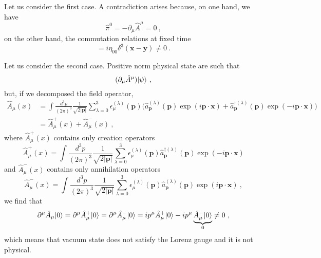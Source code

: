     Let us consider the first case. A contradiction arises because, on one hand, we have 
    \begin{equation*}
        \hat \pi^0 = - \partial_\mu \hat A^\mu = 0 ~,
    \end{equation*}
    on the other hand, the commutation relations at fixed time
    \begin{equation*}
        [\hat A_0 (\mathbf x), \hat \pi_0 (\mathbf y)] = i \eta_{00} \delta^3 (\mathbf x - \mathbf y) \neq 0 ~.
    \end{equation*}

    Let us consider the second case. Positive norm physical state are such that
    \begin{equation*}
        (\partial_\mu \hat A^\mu) \vert\psi\rangle ~,
    \end{equation*}
    but, if we decomposed the field operator,
    \begin{equation*}
    \begin{aligned}
        \hat A_\mu (x) & = \int \frac{d^3 p}{(2\pi)^3} \frac{1}{\sqrt{2 |\mathbf p|}} \sum_{\lambda=0}^{3} \epsilon_\mu^{(\lambda)} (\mathbf p) \Big ( \hat a_{\mathbf p}^{(\lambda)} (\mathbf p) \exp(i \mathbf p \cdot \mathbf x) + \hat a_{\mathbf p}^{\dagger (\lambda)} (\mathbf p) \exp(- i \mathbf p \cdot \mathbf x) \Big) \\ & = \hat A^+_\mu (x) + \hat A^-_\mu (x) ~,
    \end{aligned}
    \end{equation*}
    where $\hat A^+_\mu (x)$ contains only creation operators 
    \begin{equation*}
        \hat A^+_\mu (x) = \int \frac{d^3 p}{(2\pi)^3} \frac{1}{\sqrt{2 |\mathbf p|}} \sum_{\lambda=0}^{3} \epsilon_\mu^{(\lambda)} (\mathbf p) \hat a_{\mathbf p}^{\dagger (\lambda)} (\mathbf p) \exp(- i \mathbf p \cdot \mathbf x) 
    \end{equation*}
    and $\hat A^-_\mu (x)$ contains only annihilation operators
    \begin{equation*}
        \hat A^-_\mu (x) = \int \frac{d^3 p}{(2\pi)^3} \frac{1}{\sqrt{2 |\mathbf p|}} \sum_{\lambda=0}^{3} \epsilon_\mu^{(\lambda)} (\mathbf p) \hat a_{\mathbf p}^{(\lambda)} (\mathbf p) \exp(i \mathbf p \cdot \mathbf x) ~,
    \end{equation*}
    we find that 
    \begin{equation*}
        \partial^\mu \hat A_\mu \vert0\rangle = \partial^\mu \hat A_\mu^+ \vert0\rangle = \partial^\mu \hat A_\mu^- \vert0\rangle = i p^\mu \hat A_\mu^+ \vert0\rangle - i p^\mu \underbrace{\hat A_\mu^- \vert0\rangle}_0 \neq 0 ~,
    \end{equation*}
    which means that vacuum state does not satisfy the Lorenz gauge and it is not physical.

